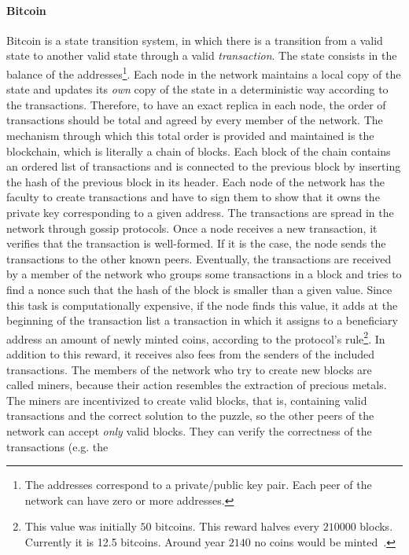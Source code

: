 \paragraph{Bitcoin}
Bitcoin is a state transition system, in which there is a transition from a
valid state to another valid state through a valid \emph{transaction}. The state
consists in the balance of the addresses\footnote{The addresses correspond to a
private/public key pair. Each peer of the network can have zero or more
addresses.}. Each node in the network maintains a local copy of the state and
updates its \emph{own} copy of the state in a deterministic way according to the
transactions. Therefore, to have an exact replica in each node, the order of
transactions should be total and agreed by every member of the network. The
mechanism through which this total order is provided and maintained is the
blockchain, which is literally a chain of blocks. Each block of the chain
contains an ordered list of transactions and is connected to the previous block
by inserting the hash of the previous block in its header. Each node of the
network has the faculty to create transactions and have to sign them to show
that it owns the private key corresponding to a given address. The transactions
are spread in the network through gossip protocols. Once a node receives a new
transaction, it verifies that the transaction is well-formed. If it is the case,
the node sends the transactions to the other known peers. Eventually, the
transactions are received by a member of the network who groups some
transactions in a block and tries to find a nonce such that the hash of the
block is smaller than a given value. Since this task is computationally
expensive, if the node finds this value, it adds at the beginning of the
transaction list a transaction in which it assigns to a beneficiary address an
amount of newly minted coins, according to the protocol's rule\footnote{This
value was initially $50$ bitcoins. This reward halves every $210000$ blocks.
Currently it is 12.5 bitcoins. Around year $2140$ no coins would be
minted~\cite{bib:masteringbitcoin}.}. In addition to this reward, it receives
also fees from the senders of the included transactions. The members of the
network who try to create new blocks are called miners, because their action
resembles the extraction of precious metals. The miners are incentivized to
create valid blocks, that is, containing valid transactions and the correct
solution to the puzzle, so the other peers of the network can accept \emph{only}
valid blocks. They can verify the correctness of the transactions (e.g. the
